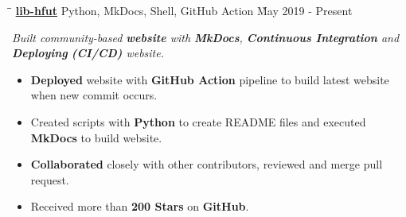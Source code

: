 \documentclass{res}
\begin{document}
\begin{resume}
    \vspace{0.00in}
    \begin{tabbing}
    \hspace{2.391in}\= \hspace{3in}\= \kill %
    \href{https://github.com/lib-hfut/lib-hfut}{\bf lib-hfut}  \> 
                Python, MkDocs, Shell, GitHub Action \` May 2019 - Present \\
    \end{tabbing}\vspace{-20pt}      %
    \vspace{-0.1in}
    \textit{Built community-based {\bf website} with {\bf MkDocs}, {\bf Continuous Integration} and 
                {\bf Deploying} {\bf (CI/CD)} website.}
    \vspace{+0.05in}
    \begin{itemize} \itemsep 1.5pt %
        \item {\bf Deployed} website with {\bf GitHub Action} pipeline to build latest website 
                when new commit occurs.
        \item Created scripts with {\bf Python} to create README files and executed {\bf MkDocs} to build website.
        \item {\bf Collaborated} closely with other contributors, reviewed and merge pull request.
        \item Received more than {\bf 200 Stars} on {\bf GitHub}.
    \end{itemize}

\end{resume}
\end{document}

